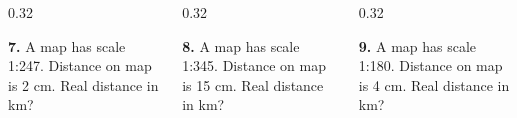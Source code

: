 \documentclass[aspectratio=169,12pt]{beamer}
\newcommand{\MMProblem}[2]{\begin{MMProblemCard}\raggedright\small\textbf{#1.} #2\par\end{MMProblemCard}}
\begin{document}
\begin{frame}[t]
\vspace{0.05em}
\begin{columns}[T,onlytextwidth]
\begin{column}{0.32\textwidth}\MMProblem{7}{A map has scale 1:247. Distance on map is 2 cm. Real distance in km?}\end{column}
\begin{column}{0.32\textwidth}\MMProblem{8}{A map has scale 1:345. Distance on map is 15 cm. Real distance in km?}\end{column}
\begin{column}{0.32\textwidth}\MMProblem{9}{A map has scale 1:180. Distance on map is 4 cm. Real distance in km?}\end{column}
\end{columns}
\end{frame}
\end{document}
